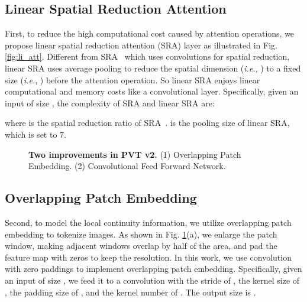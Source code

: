 \documentclass[10pt,twocolumn,letterpaper]{article}
\def\ie{\emph{i.e.}}
\begin{document}
	\subsection{Linear Spatial Reduction Attention}
	\label{sec:l-sra}
	First, to reduce the high computational cost caused by attention operations, we propose linear spatial reduction attention (SRA) layer as illustrated in Fig. \ref{fig:li_att}.
	Different from SRA~\cite{pvt} which uses convolutions for spatial reduction, linear SRA uses average pooling to reduce the spatial dimension (\ie, ) to a fixed size (\ie, ) before the attention operation.
	So linear SRA enjoys linear computational and memory costs like a convolutional layer.
	Specifically, given an input of size , the complexity of SRA and linear SRA are:
	
	
	where  is the spatial reduction ratio of SRA~\cite{pvt}.  is the pooling size of linear SRA, which is set to 7.
	
	\begin{figure}[t]
		\centering
		\setlength{\fboxrule}{0pt}
		\caption{\textbf{Two improvements in PVT v2.} (1) Overlapping Patch Embedding. (2) Convolutional Feed Forward Network.}
		\label{fig:diff}
	\end{figure}
	
	\subsection{Overlapping Patch Embedding} 
	\label{sec:o-pe}
	Second, to model the local continuity information, we utilize overlapping patch embedding to tokenize images. As shown in Fig. \ref{fig:diff}(a), we enlarge the patch window, making adjacent windows overlap by half of the area, and pad the feature map with zeros to keep the resolution.
In this work, we use convolution with zero paddings to implement overlapping patch embedding.
Specifically, given an input of size , we feed it to a convolution with the stride of , the kernel size of , the padding size of , and the kernel number of .
The output size is .
	
\end{document}
